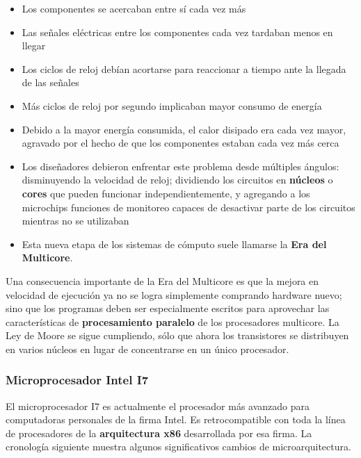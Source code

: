 \documentclass[spanish,a4paper,]{article}
\providecommand{\tightlist}{%
  \setlength{\itemsep}{0pt}\setlength{\parskip}{0pt}}
\begin{document}
\begin{itemize}
\tightlist
\item
  Los componentes se acercaban entre sí cada vez más
\item
  Las señales eléctricas entre los componentes cada vez tardaban menos
  en llegar
\item
  Los ciclos de reloj debían acortarse para reaccionar a tiempo ante la
  llegada de las señales
\item
  Más ciclos de reloj por segundo implicaban mayor consumo de energía
\item
  Debido a la mayor energía consumida, el calor disipado era cada vez
  mayor, agravado por el hecho de que los componentes estaban cada vez
  más cerca
\item
  Los diseñadores debieron enfrentar este problema desde múltiples
  ángulos: disminuyendo la velocidad de reloj; dividiendo los circuitos
  en \textbf{núcleos} o \textbf{cores} que pueden funcionar
  independientemente, y agregando a los microchips funciones de
  monitoreo capaces de desactivar parte de los circuitos mientras no se
  utilizaban
\item
  Esta nueva etapa de los sistemas de cómputo suele llamarse la
  \textbf{Era del Multicore}.
\end{itemize}

Una consecuencia importante de la Era del Multicore es que la mejora en
velocidad de ejecución ya no se logra simplemente comprando hardware
nuevo; sino que los programas deben ser especialmente escritos para
aprovechar las características de \textbf{procesamiento paralelo} de los
procesadores multicore. La Ley de Moore se sigue cumpliendo, sólo que
ahora los transistores se distribuyen en varios núcleos en lugar de
concentrarse en un único procesador.

\hypertarget{microprocesador-intel-i7}{%
\subsubsection{Microprocesador Intel
I7}\label{microprocesador-intel-i7}}

El microprocesador I7 es actualmente el procesador más avanzado para
computadoras personales de la firma Intel. Es retrocompatible con toda
la línea de procesadores de la \textbf{arquitectura x86} desarrollada
por esa firma. La cronología siguiente muestra algunos significativos
cambios de microarquitectura.
\end{document}
